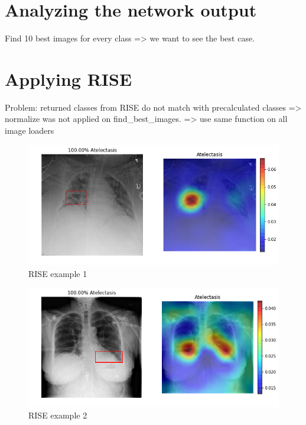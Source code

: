 \section{Analyzing the network output}
Find 10 best images for every class => we want to see the best case.



\section{Applying RISE}
Problem: returned classes from RISE do not match with precalculated classes
=> normalize was not applied on find\_best\_images.
=> use same function on all image loaders



\begin{figure}[h]
\centering
\caption{RISE example 1}
\includegraphics[width=12cm]{chapters/03_classification/images/rise_0.png}
\end{figure}

\begin{figure}[h]
\centering
\caption{RISE example 2}
\includegraphics[width=12cm]{chapters/03_classification/images/rise_2.png}
\end{figure}

